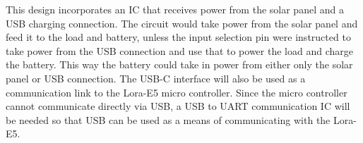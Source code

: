 This design incorporates an IC that receives power from the solar panel and a USB charging connection. The circuit would take power from the solar panel and feed it to the load and battery, unless the input selection pin were instructed to take power from the USB connection and use that to power the load and charge the battery. This way the battery could take in power from either only the solar panel or USB connection. The USB-C interface will also be used as a communication link to the Lora-E5 micro controller. Since the micro controller cannot communicate directly via USB, a USB to UART communication IC will be needed so that USB can be used as a means of communicating with the Lora-E5. 
\cite{USB-C}
